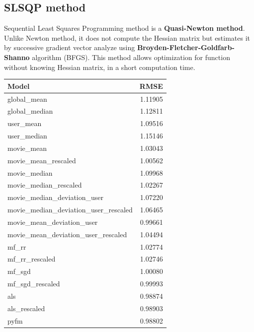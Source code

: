 \documentclass[10pt,conference,compsocconf]{IEEEtran}
\begin{document}
\subsection{SLSQP method}
\label{SLSQP}
Sequential Least Squares Programming method is a \textbf{Quasi-Newton method}. Unlike Newton method, it does not compute the Hessian matrix but estimates it by successive gradient vector analyze \cite{wiki:quasi_newton} using \textbf{Broyden-Fletcher-Goldfarb-Shanno} algorithm (BFGS). This method allows optimization for function without knowing Hessian matrix, in a short computation time.

\begin{table}[htbp]
\centering
\begin{tabular}[c]{| l r |}
\hline
Model & RMSE \\
\hline 
\hline
global\_mean                             			& 1.11905\\
global\_median                          			 	& 1.12811\\
user\_mean                               				& 1.09516\\
user\_median                             			& 1.15146\\
movie\_mean                              			& 1.03043\\
movie\_mean\_rescaled                    			& 1.00562\\
movie\_median                            			& 1.09968\\
movie\_median\_rescaled                  		& 1.02267\\
movie\_median\_deviation\_user           		& 1.07220\\
movie\_median\_deviation\_user\_rescaled 	& 1.06465\\
movie\_mean\_deviation\_user             		& 0.99661 \\
movie\_mean\_deviation\_user\_rescaled   	& 1.04494\\
mf\_rr                                   				& 1.02774\\
mf\_rr\_rescaled                         			& 1.02746\\
mf\_sgd                                  				& 1.00080\\
mf\_sgd\_rescaled                       			& 0.99993 \\
als                                      				& 0.98874\\
als\_rescaled                            				& 0.98903 \\
pyfm                                     				& 0.98802 \\

\end{tabular}
\end{table}
\end{document}
